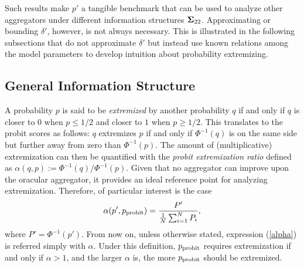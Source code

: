 \documentclass[12pt]{article}
\theoremstyle{definition}
\theoremstyle{definition}
\def\probit{p_{\rm probit}}
\begin{document}
Such results make $p'$ a tangible benchmark that can be used to analyze other aggregators under different information structures ${\bf\Sigma}_{22}$. Approximating or bounding $\delta'$, however, is not always necessary. This is illustrated in the following subsections that do not approximate $\delta'$ but instead use known relations among the model parameters to develop intuition about probability extremizing. 

\subsection{General Information Structure}
A probability $p$ is said to be \textit{extremized} by another probability $q$ if and only
if $q$ is closer to $0$ when $p \leq 1/2$ and closer to $1$ when $p
\geq 1/2$. This translates to the probit scores as follows: $q$ extremizes $p$ if and only if  $\Phi^{-1}(q)$ is on the same side but further away from zero than $\Phi^{-1}(p)$. The amount of (multiplicative) extremization can then be quantified with the {\em probit extremization ratio} defined as 
 $\alpha(q,p) := \Phi^{-1}(q) / \Phi^{-1} (p)$. Given that no aggregator can improve upon the oracular aggregator, it provides an ideal
reference point for analyzing extremization. Therefore, of particular interest is the case
\begin{align}
\alpha(p', \probit)  = \frac{P'}{\frac{1}{N}\sum_{i=1}^N P_{i}}, \label{alpha}
\end{align}
where $P' = \Phi^{-1}(p')$. From now on, unless otherwise stated, expression (\ref{alpha}) is referred simply with
$\alpha$. 
Under this definition, $\probit$
requires extremization if and only if $\alpha > 1$, and the larger $\alpha$ is, the more $\probit$ should be extremized. 
\end{document}
